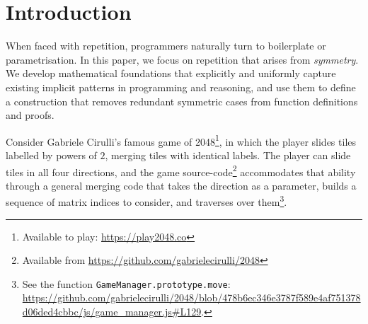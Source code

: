 \section{Introduction}

When faced with repetition, programmers naturally turn to boilerplate or
parametrisation. In this paper, we focus on repetition that
arises from \emph{symmetry}. We develop
mathematical foundations that explicitly and uniformly capture
existing implicit patterns in programming and reasoning, and use them
to define a construction that removes redundant symmetric cases from
function definitions and proofs.

Consider Gabriele Cirulli's famous game of 2048\footnote{Available to
play: \url{https://play2048.co}}, in which the player slides tiles
labelled by powers of $2$, merging tiles with identical labels. The
player can slide tiles in all four directions, and the game
source-code\footnote{Available from
\url{https://github.com/gabrielecirulli/2048}} accommodates that
ability through a general merging code that takes the direction as a
parameter, builds a sequence of matrix indices to consider, and
traverses over them\footnote{See the function
\texttt{GameManager.prototype.move}:\\
\url{https://github.com/gabrielecirulli/2048/blob/478b6ec346e3787f589e4af751378d06ded4cbbc/js/game_manager.js\#L129}.}.

